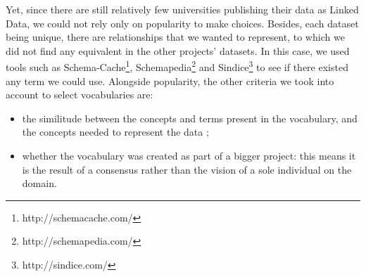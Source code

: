 \documentclass[a4paper,11pt]{report}
\begin{document}

Yet, since there are still relatively few universities publishing their data as Linked Data, we could not rely only on popularity to make choices. Besides, each dataset being unique, there are relationships that we wanted to represent, to which we did not find any equivalent in the other projects' datasets. In this case, we used tools such as Schema-Cache\footnote{http://schemacache.com/}, Schemapedia\footnote{http://schemapedia.com/} and Sindice\footnote{http://sindice.com/} to see if there existed any term we could use. Alongside popularity, the other criteria we took into account to select vocabularies are:
\begin{itemize}
\item the similitude between the concepts and terms present in the vocabulary, and the concepts needed to represent the data ;
\item whether the vocabulary was created as part of a bigger project: this means it is the result of a consensus rather than the vision of a sole individual on the domain.
\end{itemize}
\end{document}
